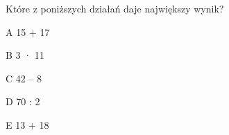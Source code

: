 \begin{tresc}
Które z poniższych działań daje największy wynik?
\end{tresc}
\begin{wariant}{A} 15 + 17 \end{wariant}
\begin{wariant}{B} 3 · 11 \end{wariant}
\begin{wariant}{C} 42 – 8 \end{wariant}
\begin{wariant}{D} 70 : 2 \end{wariant}
\begin{wariant}{E} 13 + 18 \end{wariant}
